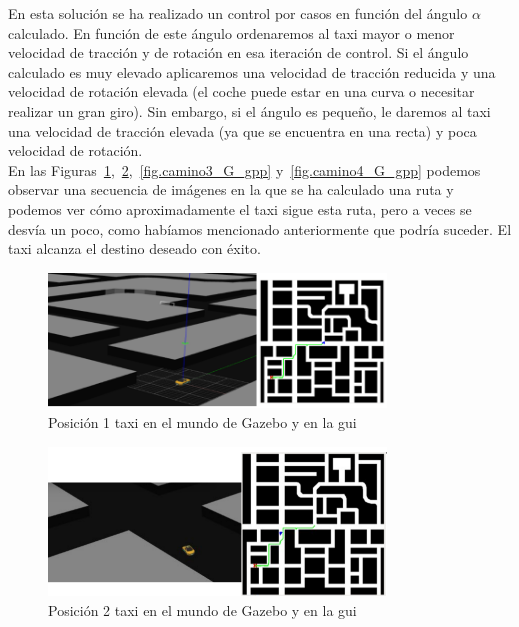 En esta solución se ha realizado un control por casos en función del ángulo \(\alpha\)  calculado. En función de este ángulo ordenaremos al taxi mayor o menor velocidad de tracción y de rotación en esa iteración de control. Si el ángulo calculado es muy elevado aplicaremos una velocidad de tracción reducida y una velocidad de rotación elevada (el coche puede estar en una curva o necesitar realizar un gran giro). Sin embargo, si el ángulo es pequeño, le daremos al taxi una velocidad de tracción elevada (ya que se encuentra en una recta) y poca velocidad de rotación.\\

En las Figuras~\ref{fig.camino1_G_gpp},~\ref{fig.camino2_G_gpp},~\ref{fig.camino3_G_gpp} y~\ref{fig.camino4_G_gpp} podemos observar una secuencia de imágenes en la que se ha calculado una ruta y podemos ver cómo aproximadamente el taxi sigue esta ruta, pero a veces se desvía un poco, como habíamos mencionado anteriormente que podría suceder. El taxi alcanza el destino deseado con éxito.

\begin{figure}[H]
  \begin{center}
    \includegraphics[width=0.8\textwidth]{figures/GPP/camino1_G.png}
		\caption{Posición 1 taxi en el mundo de Gazebo y en la \acrshort{gui}}
		\label{fig.camino1_G_gpp}
		\end{center}
\end{figure}

\begin{figure}[H]
  \begin{center}
    \includegraphics[width=0.8\textwidth]{figures/GPP/camino2_G.png}
		\caption{Posición 2 taxi en el mundo de Gazebo y en la \acrshort{gui}}
		\label{fig.camino2_G_gpp}
		\end{center}
\end{figure}

